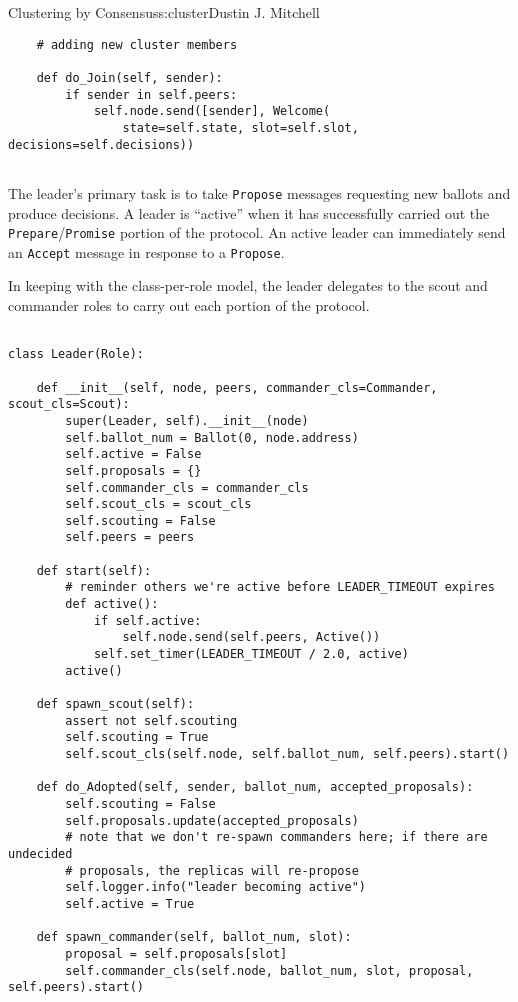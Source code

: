 \begin{aosachapter}{Clustering by Consensus}{s:cluster}{Dustin J. Mitchell}
\begin{verbatim}
    # adding new cluster members

    def do_Join(self, sender):
        if sender in self.peers:
            self.node.send([sender], Welcome(
                state=self.state, slot=self.slot, decisions=self.decisions))
    
\end{verbatim}

\label{leader-scout-and-commander}

The leader's primary task is to take \texttt{Propose} messages
requesting new ballots and produce decisions. A leader is ``active''
when it has successfully carried out the
\texttt{Prepare}/\texttt{Promise} portion of the protocol. An active
leader can immediately send an \texttt{Accept} message in response to a
\texttt{Propose}.

In keeping with the class-per-role model, the leader delegates to the
scout and commander roles to carry out each portion of the protocol.

\begin{verbatim}

class Leader(Role):

    def __init__(self, node, peers, commander_cls=Commander, scout_cls=Scout):
        super(Leader, self).__init__(node)
        self.ballot_num = Ballot(0, node.address)
        self.active = False
        self.proposals = {}
        self.commander_cls = commander_cls
        self.scout_cls = scout_cls
        self.scouting = False
        self.peers = peers

    def start(self):
        # reminder others we're active before LEADER_TIMEOUT expires
        def active():
            if self.active:
                self.node.send(self.peers, Active())
            self.set_timer(LEADER_TIMEOUT / 2.0, active)
        active()

    def spawn_scout(self):
        assert not self.scouting
        self.scouting = True
        self.scout_cls(self.node, self.ballot_num, self.peers).start()

    def do_Adopted(self, sender, ballot_num, accepted_proposals):
        self.scouting = False
        self.proposals.update(accepted_proposals)
        # note that we don't re-spawn commanders here; if there are undecided
        # proposals, the replicas will re-propose
        self.logger.info("leader becoming active")
        self.active = True

    def spawn_commander(self, ballot_num, slot):
        proposal = self.proposals[slot]
        self.commander_cls(self.node, ballot_num, slot, proposal, self.peers).start()


\end{verbatim}
\end{aosachapter}

